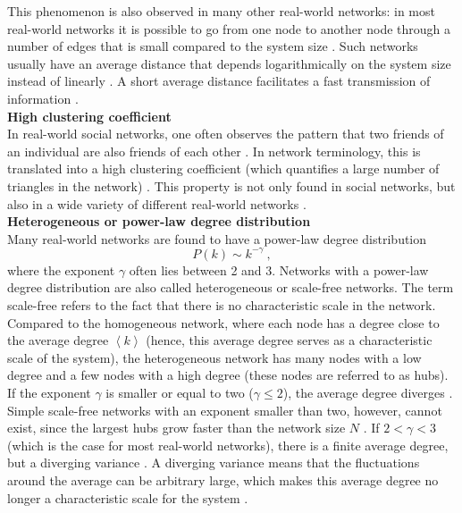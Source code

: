 \documentclass[11 pt , letterpaper , twoside , openright]{book}
\begin{document}
\newline
This phenomenon is also observed in many other real-world networks: in most real-world networks it is possible to go from one node to another node through a number of edges that is small compared to the system size \cite{RealWorld}. Such networks usually have an average distance that depends logarithmically on the system size instead of linearly \cite{Newman2003}. A short average distance facilitates a fast transmission of information \cite{Newman2003}\cite{Zhang2014}.\\
\newpage
\noindent
\textbf{High clustering coefficient}\\
\newline
In real-world social networks, one often observes the pattern that two friends of an individual are also friends of each other \cite{RealWorld}. In network terminology, this is translated into a high clustering coefficient (which quantifies a large number of triangles in the network) \cite{RealWorld}. This property is not only found in social networks, but also in a wide variety of different real-world networks \cite{RealWorld}.\\
\newline
\textbf{Heterogeneous or power-law degree distribution}\\
\newline
Many real-world networks are found to have a power-law degree distribution \cite{RealWorld}
\begin{equation}
	P(k) \sim k^{-\gamma} \ ,
\end{equation}
where the exponent $\gamma$ often lies between 2 and 3. Networks with a power-law degree distribution are also called heterogeneous or scale-free networks. The term scale-free refers to the fact that there is no characteristic scale in the network. Compared to the homogeneous network, where each node has a degree close to the average degree $\left<k\right>$ (hence, this average degree serves as a characteristic scale of the system), the heterogeneous network has many nodes with a low degree and a few nodes with a high degree (these nodes are referred to as hubs). If the exponent $\gamma$ is smaller or equal to two ($\gamma \leqslant 2$), the average degree diverges \cite{Newman2005}. Simple scale-free networks with an exponent smaller than two, however, cannot exist, since the largest hubs grow faster than the network size $N$ \cite{Barabasi2016}. If $2 < \gamma < 3$ (which is the case for most real-world networks), there is a finite average degree, but a diverging variance \cite{Newman2005}. A diverging variance means that the fluctuations around the average can be arbitrary large, which makes this average degree no longer a characteristic scale for the system \cite{Barabasi2016}.\\
\end{document}
